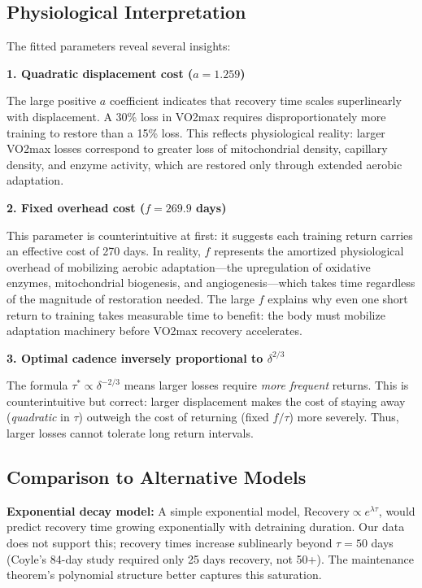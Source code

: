 \documentclass[12pt,a4paper]{article}
\begin{document}
\subsection{Physiological Interpretation}

The fitted parameters reveal several insights:

\textbf{1. Quadratic displacement cost ($a = 1.259$)}

The large positive $a$ coefficient indicates that recovery time scales superlinearly with displacement. A 30\% loss in VO2max requires disproportionately more training to restore than a 15\% loss. This reflects physiological reality: larger VO2max losses correspond to greater loss of mitochondrial density, capillary density, and enzyme activity, which are restored only through extended aerobic adaptation.

\textbf{2. Fixed overhead cost ($f = 269.9$ days)}

This parameter is counterintuitive at first: it suggests each training return carries an effective cost of 270 days. In reality, $f$ represents the amortized physiological overhead of mobilizing aerobic adaptation—the upregulation of oxidative enzymes, mitochondrial biogenesis, and angiogenesis—which takes time regardless of the magnitude of restoration needed. The large $f$ explains why even one short return to training takes measurable time to benefit: the body must mobilize adaptation machinery before VO2max recovery accelerates.

\textbf{3. Optimal cadence inversely proportional to $\delta^{2/3}$}

The formula $\tau^* \propto \delta^{-2/3}$ means larger losses require \emph{more frequent} returns. This is counterintuitive but correct: larger displacement makes the cost of staying away (\emph{quadratic} in $\tau$) outweigh the cost of returning (fixed $f/\tau$) more severely. Thus, larger losses cannot tolerate long return intervals.

\subsection{Comparison to Alternative Models}

\textbf{Exponential decay model:} A simple exponential model, $\text{Recovery} \propto e^{\lambda \tau}$, would predict recovery time growing exponentially with detraining duration. Our data does not support this; recovery times increase sublinearly beyond $\tau = 50$ days (Coyle's 84-day study required only 25 days recovery, not 50+). The maintenance theorem's polynomial structure better captures this saturation.
\end{document}
